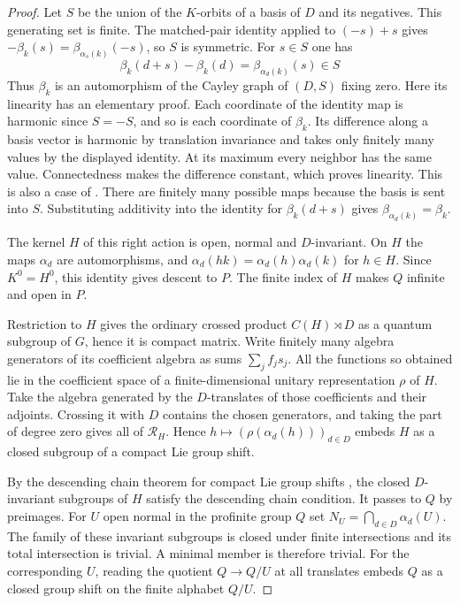 \documentclass[11pt,a4paper]{article}
\theoremstyle{remark}
\begin{document}
\begin{proof}
Let $S$ be the union of the $K$-orbits of a basis of $D$ and its
negatives. This generating set is finite. The matched-pair identity
applied to $(-s)+s$ gives $-\beta_k(s)=\beta_{\alpha_s(k)}(-s)$, so
$S$ is symmetric. For $s\in S$ one has
\[
 \beta_k(d+s)-\beta_k(d)=\beta_{\alpha_d(k)}(s)\in S
\]
Thus $\beta_k$ is an automorphism of the Cayley graph of $(D,S)$ fixing
zero. Here its linearity has an elementary proof. Each coordinate of the
identity map is harmonic since $S=-S$, and so is each coordinate of
$\beta_k$. Its difference along a basis vector is harmonic by translation
invariance and takes only finitely many values by the displayed identity.
At its maximum every neighbor has the same value. Connectedness makes
the difference constant, which proves linearity. This is also a case of
\cite{mmv}. There are finitely many possible maps because the basis is
sent into $S$. Substituting additivity into the identity for $\beta_k(d+s)$ gives
$\beta_{\alpha_d(k)}=\beta_k$.

The kernel $H$ of this right action is open, normal and $D$-invariant.
On $H$ the maps $\alpha_d$ are automorphisms, and
$\alpha_d(hk)=\alpha_d(h)\alpha_d(k)$ for $h\in H$. Since $K^0=H^0$,
this identity gives descent to $P$. The finite index of $H$ makes
$Q$ infinite and open in $P$.

Restriction to $H$ gives the ordinary crossed product
$C(H)\rtimes D$ as a quantum subgroup of $G$, hence it is compact matrix.
Write finitely many algebra generators of its coefficient algebra as
sums $\sum_j f_js_j$. All the functions so obtained lie in the
coefficient space of a finite-dimensional unitary representation $\rho$
of $H$. Take the algebra generated by the $D$-translates of those
coefficients and their adjoints. Crossing it with $D$ contains the
chosen generators, and taking the part of degree zero gives all of
$\mathcal R_H$. Hence
$h\mapsto(\rho(\alpha_d(h)))_{d\in D}$ embeds $H$ as a closed subgroup
of a compact Lie group shift.

By the descending chain theorem for compact Lie group shifts
\cite[Theorem~3.2]{ks}, the closed $D$-invariant subgroups of
$H$ satisfy the descending chain condition. It passes to $Q$ by
preimages. For $U$ open normal in the profinite group $Q$ set
$N_U=\bigcap_{d\in D}\alpha_d(U)$. The family of these invariant
subgroups is closed under finite intersections and its total intersection
is trivial. A minimal member is therefore trivial. For the corresponding
$U$, reading the quotient $Q\to Q/U$ at all translates embeds $Q$
as a closed group shift on the finite alphabet $Q/U$.
\end{proof}
\end{document}
